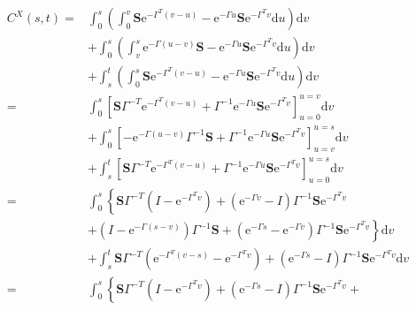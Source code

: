 \documentclass[10pt,a4paper]{article}
\newcommand{\rmd}{\text{d}}
\newcommand{\e}{\text{e}}
\newcommand{\inv}{^{-1}}
\newcommand{\Sinf}{\mathbf{S}}
\begin{document}
\begin{align*}
C^X(s,t) =& \int_0^s \left( \int_0^v
  \Sinf\e^{-\Gamma^T (v - u)} -\e^{-\Gamma u}\Sinf \e^{-\Gamma^T v} 
  \rmd u \right) \rmd v \\
  &+ \int_0^s \left( \int_v^s 
  \e^{-\Gamma (u - v)}\Sinf -\e^{-\Gamma u}\Sinf \e^{-\Gamma^T v} 
  \rmd u \right) \rmd v \\
  &+ \int_s^t \left( \int_0^s 
  \Sinf\e^{-\Gamma^T (v - u)} -\e^{-\Gamma u}\Sinf \e^{-\Gamma^T v} 
  \rmd u \right) \rmd v\\
  =& \int_0^s \left[ 
  \Sinf\Gamma^{-T}\e^{-\Gamma^T (v - u)} +\Gamma\inv\e^{-\Gamma u}\Sinf \e^{-\Gamma^T v} 
  \right]_{u = 0}^{u = v} 
  \rmd v\\
  &+ \int_0^s \left[
  -\e^{-\Gamma (u - v)}\Gamma\inv\Sinf + \Gamma\inv\e^{-\Gamma u}\Sinf \e^{-\Gamma^T v} 
  \right]^{u = s}_{u = v}
  \rmd v \\
  &+ \int_s^t \left[ 
  \Sinf\Gamma^{-T}\e^{-\Gamma^T (v - u)} +\Gamma\inv\e^{-\Gamma u}\Sinf \e^{-\Gamma^T v} 
  \right]_{u = 0}^{u = s} 
  \rmd v\\
  =& \int_0^s \left\lbrace
  \Sinf \Gamma^{-T}\left(I - \e^{-\Gamma^T v}\right) + \left(\e^{-\Gamma v} - I\right)\Gamma\inv\Sinf  \e^{-\Gamma^T v}
   \right .\\
   &+ \left.
  \left(I - \e^{-\Gamma(s - v)}\right)\Gamma\inv\Sinf + \left( \e^{-\Gamma s} - \e^{-\Gamma v}\right)\Gamma\inv\Sinf \e^{-\Gamma^T v} 
  \right\rbrace \rmd v \\
  &+ \int_s^t 
  \Sinf\Gamma^{-T}\left(\e^{-\Gamma^T (v - s)} - \e^{-\Gamma^T v}\right) +\left(\e^{-\Gamma s} - I\right)\Gamma\inv\Sinf \e^{-\Gamma^T v} 
  \rmd v\\
  =& \int_0^s \left\lbrace
  \Sinf \Gamma^{-T}\left(I - \e^{-\Gamma^T v}\right) + 
  \left(\e^{-\Gamma s} - I\right)\Gamma\inv\Sinf  \e^{-\Gamma^T v} + 

\end{align*}
\end{document}
